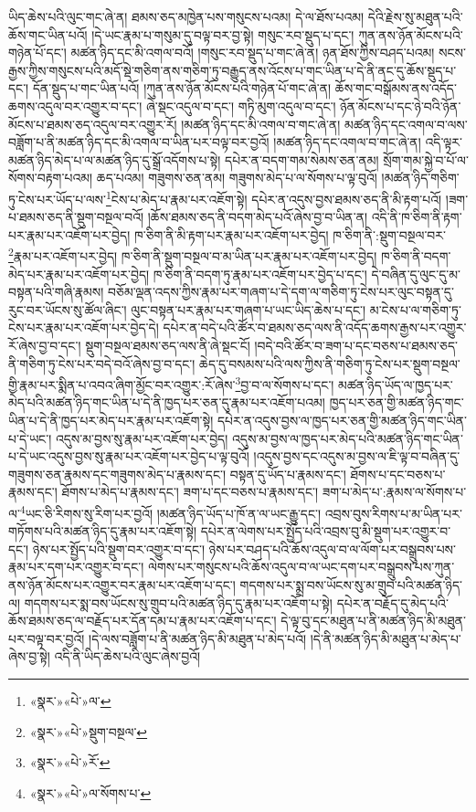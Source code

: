 ཡིད་ཆེས་པའི་ལུང་གང་ཞེ་ན། ཐམས་ཅད་མཁྱེན་པས་གསུངས་པའམ། དེ་ལ་ཐོས་པའམ། དེའི་རྗེས་སུ་མཐུན་པའི་ཆོས་གང་ཡིན་པའོ། །དེ་ཡང་རྣམ་པ་གསུམ་དུ་བལྟ་བར་བྱ་སྟེ། གསུང་རབ་སྡུད་པ་དང་། ཀུན་ནས་ཉོན་མོངས་པའི་གཉེན་པོ་དང་། མཚན་ཉིད་དང་མི་འགལ་བའོ། །གསུང་རབ་སྡུད་པ་གང་ཞེ་ན། ཉན་ཐོས་ཀྱིས་བཤད་པའམ། སངས་རྒྱས་ཀྱིས་གསུངས་པའི་མདོ་སྡེ་གཅིག་ནས་གཅིག་ཏུ་བརྒྱུད་ནས་འོངས་པ་གང་ཡིན་པ་དེ་ནི་ནང་དུ་ཆོས་སྡུད་པ་དང་། དོན་སྡུད་པ་གང་ཡིན་པའོ། །ཀུན་ནས་ཉོན་མོངས་པའི་གཉེན་པོ་གང་ཞེ་ན། ཆོས་གང་བསྒོམས་ནས་འདོད་ཆགས་འདུལ་བར་འགྱུར་བ་དང་། ཞེ་སྡང་འདུལ་བ་དང་། གཏི་མུག་འདུལ་བ་དང་། ཉོན་མོངས་པ་དང་ཉེ་བའི་ཉོན་མོངས་པ་ཐམས་ཅད་འདུལ་བར་འགྱུར་རོ། །མཚན་ཉིད་དང་མི་འགལ་བ་གང་ཞེ་ན། མཚན་ཉིད་དང་འགལ་བ་ལས་བཟློག་པ་ནི་མཚན་ཉིད་དང་མི་འགལ་བ་ཡིན་པར་བལྟ་བར་བྱའོ། །མཚན་ཉིད་དང་འགལ་བ་གང་ཞེ་ན། འདི་ལྟར་མཚན་ཉིད་མེད་པ་ལ་མཚན་ཉིད་དུ་སྒྲོ་འདོགས་པ་སྟེ། དཔེར་ན་བདག་གམ་སེམས་ཅན་ནམ། སྲོག་གམ་སྐྱེ་བ་པོ་ལ་སོགས་བརྟག་པའམ། ཆད་པའམ། གཟུགས་ཅན་ནམ། གཟུགས་མེད་པ་ལ་སོགས་པ་ལྟ་བུའོ། །མཚན་ཉིད་གཅིག་ཏུ་ངེས་པར་ཡོད་པ་ལས་\footnote{«སྣར་»«པེ་»ལ་}ངེས་པ་མེད་པ་རྣམ་པར་འཇོག་སྟེ། དཔེར་ན་འདུས་བྱས་ཐམས་ཅད་ནི་མི་རྟག་པའོ། །ཟག་པ་ཐམས་ཅད་ནི་སྡུག་བསྔལ་བའོ། །ཆོས་ཐམས་ཅད་ནི་བདག་མེད་པའོ་ཞེས་བྱ་བ་ཡིན་ན། འདི་ནི་ཁ་ཅིག་ནི་རྟག་པར་རྣམ་པར་འཇོག་པར་བྱེད། ཁ་ཅིག་ནི་མི་རྟག་པར་རྣམ་པར་འཇོག་པར་བྱེད། ཁ་ཅིག་ནི་:སྡུག་བསྔལ་བར་\footnote{«སྣར་»«པེ་»སྡུག་བསྔལ་}རྣམ་པར་འཇོག་པར་བྱེད། ཁ་ཅིག་ནི་སྡུག་བསྔལ་བ་མ་ཡིན་པར་རྣམ་པར་འཇོག་པར་བྱེད། ཁ་ཅིག་ནི་བདག་མེད་པར་རྣམ་པར་འཇོག་པར་བྱེད། ཁ་ཅིག་ནི་བདག་ཏུ་རྣམ་པར་འཇོག་པར་བྱེད་པ་དང་། དེ་བཞིན་དུ་ལུང་དུ་མ་བསྟན་པའི་གཞི་རྣམས། བཅོམ་ལྡན་འདས་ཀྱིས་རྣམ་པར་གཞག་པ་དེ་དག་ལ་གཅིག་ཏུ་ངེས་པར་ལུང་བསྟན་དུ་རུང་བར་ཡོངས་སུ་ཚོལ་ཞིང་། ལུང་བསྟན་པར་རྣམ་པར་གཞག་པ་ཡང་ཡིད་ཆེས་པ་དང་། མ་ངེས་པ་ལ་གཅིག་ཏུ་ངེས་པར་རྣམ་པར་འཇོག་པར་བྱེད་དེ། དཔེར་ན་བདེ་པའི་ཚོར་བ་ཐམས་ཅད་ལས་ནི་འདོད་ཆགས་རྒྱས་པར་འགྱུར་རོ་ཞེས་བྱ་བ་དང་། སྡུག་བསྔལ་ཐམས་ཅད་ལས་ནི་ཞེ་སྡང་ངོ། །བདེ་བའི་ཚོར་བ་ཟག་པ་དང་བཅས་པ་ཐམས་ཅད་ནི་གཅིག་ཏུ་ངེས་པར་བདེ་བའོ་ཞེས་བྱ་བ་དང་། ཆེད་དུ་བསམས་པའི་ལས་ཀྱིས་ནི་གཅིག་ཏུ་ངེས་པར་སྡུག་བསྔལ་གྱི་རྣམ་པར་སྨིན་པ་འབའ་ཞིག་མྱོང་བར་འགྱུར་:རོ་ཞེས་\footnote{«སྣར་»«པེ་»རོ་}བྱ་བ་ལ་སོགས་པ་དང་། མཚན་ཉིད་ཡོད་ལ་ཁྱད་པར་མེད་པའི་མཚན་ཉིད་གང་ཡིན་པ་དེ་ནི་ཁྱད་པར་ཅན་དུ་རྣམ་པར་འཇོག་པའམ། ཁྱད་པར་ཅན་གྱི་མཚན་ཉིད་གང་ཡིན་པ་དེ་ནི་ཁྱད་པར་མེད་པར་རྣམ་པར་འཇོག་སྟེ། དཔེར་ན་འདུས་བྱས་ལ་ཁྱད་པར་ཅན་གྱི་མཚན་ཉིད་གང་ཡིན་པ་དེ་ཡང་། འདུས་མ་བྱས་སུ་རྣམ་པར་འཇོག་པར་བྱེད། འདུས་མ་བྱས་ལ་ཁྱད་པར་མེད་པའི་མཚན་ཉིད་གང་ཡིན་པ་དེ་ཡང་འདུས་བྱས་སུ་རྣམ་པར་འཇོག་པར་བྱེད་པ་ལྟ་བུའོ། །འདུས་བྱས་དང་འདུས་མ་བྱས་ལ་ཇི་ལྟ་བ་བཞིན་དུ་གཟུགས་ཅན་རྣམས་དང་གཟུགས་མེད་པ་རྣམས་དང་། བསྟན་དུ་ཡོད་པ་རྣམས་དང་། ཐོགས་པ་དང་བཅས་པ་རྣམས་དང་། ཐོགས་པ་མེད་པ་རྣམས་དང་། ཟག་པ་དང་བཅས་པ་རྣམས་དང་། ཟག་པ་མེད་པ་:རྣམས་ལ་སོགས་པ་ལ་\footnote{«སྣར་»«པེ་»ལ་སོགས་པ་}ཡང་ཅི་རིགས་སུ་རིག་པར་བྱའོ། །མཚན་ཉིད་ཡོད་པ་ཁོ་ན་ལ་ཡང་རྒྱུ་དང་། འབྲས་བུས་རིགས་པ་མ་ཡིན་པར་གཏོགས་པའི་མཚན་ཉིད་དུ་རྣམ་པར་འཇོག་སྟེ། དཔེར་ན་ལེགས་པར་སྤྱོད་པའི་འབྲས་བུ་མི་སྡུག་པར་འགྱུར་བ་དང་། ཉེས་པར་སྤྱོད་པའི་སྡུག་བར་འགྱུར་བ་དང་། ཉེས་པར་བཤད་པའི་ཆོས་འདུལ་བ་ལ་ལོག་པར་བསྒྲུབས་པས་རྣམ་པར་དག་པར་འགྱུར་བ་དང་། ལེགས་པར་གསུངས་པའི་ཆོས་འདུལ་བ་ལ་ཡང་དག་པར་བསྒྲུབས་པས་ཀུན་ནས་ཉོན་མོངས་པར་འགྱུར་བར་རྣམ་པར་འཇོག་པ་དང་། གདགས་པར་སྨྲ་བས་ཡོངས་སུ་མ་གྲུབ་པའི་མཚན་ཉིད་ལ། གདགས་པར་སྨ་བས་ཡོངས་སུ་གྲུབ་པའི་མཚན་ཉིད་དུ་རྣམ་པར་འཇོག་པ་སྟེ། དཔེར་ན་བརྗོད་དུ་མེད་པའི་ཆོས་ཐམས་ཅད་ལ་བརྗོད་པར་དོན་དམ་པ་རྣམ་པར་འཇོག་པ་དང་། དེ་ལྟ་བུ་དང་མཐུན་པ་ནི་མཚན་ཉིད་མི་མཐུན་པར་བལྟ་བར་བྱའོ། །དེ་ལས་བཟློག་པ་ནི་མཚན་ཉིད་མི་མཐུན་པ་མེད་པའོ། །དེ་ནི་མཚན་ཉིད་མི་མཐུན་པ་མེད་པ་ཞེས་བྱ་སྟེ། འདི་ནི་ཡིད་ཆེས་པའི་ལུང་ཞེས་བྱའོ། 